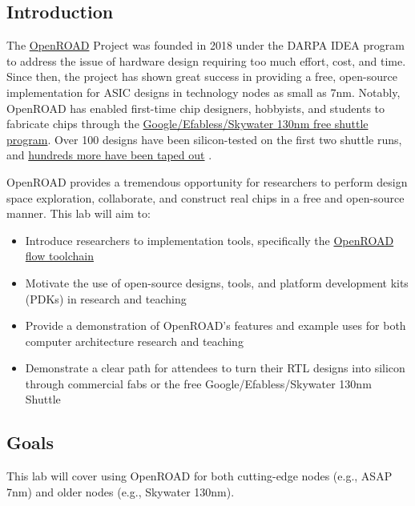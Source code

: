 \documentclass[a4paper,12pt,twoside]{article}
\begin{document}
\subsection{Introduction}
The \href{https://theopenroadproject.org/}{OpenROAD} Project was founded in 2018 under the DARPA IDEA program to address the issue of hardware design requiring too much effort, cost, and time. Since then, the project has shown great success in providing a free, open-source implementation for ASIC designs in technology nodes as small as 7nm. Notably, OpenROAD has enabled first-time chip designers, hobbyists, and students to fabricate chips through the \href{https://efabless.com/open_shuttle_program}{Google/Efabless/Skywater 130nm free shuttle program}. Over 100 designs have been silicon-tested on the first two shuttle runs, and \href{https://opensource.googleblog.com/2022/07/SkyWater-and-Google-expand-open-source-program-to-new-90nm-technology.html}{hundreds more have been taped out} \cite{ajayi2019openroad} \cite{ajayi2019toward}.

OpenROAD provides a tremendous opportunity for researchers to perform design space exploration, collaborate, and construct real chips in a free and open-source manner. This lab will aim to:
\begin{itemize}
    \item Introduce researchers to implementation tools, specifically the \href{https://github.com/The-OpenROAD-Project/OpenROAD-flow-scripts}{OpenROAD flow toolchain}
    \item Motivate the use of open-source designs, tools, and platform development kits (PDKs) in research and teaching
    \item Provide a demonstration of OpenROAD’s features and example uses for both computer architecture research and teaching
    \item Demonstrate a clear path for attendees to turn their RTL designs into silicon through commercial fabs or the free Google/Efabless/Skywater 130nm Shuttle
\end{itemize}
\subsection{Goals}
This lab will cover using OpenROAD for both cutting-edge nodes (e.g., ASAP 7nm) and older nodes (e.g., Skywater 130nm).
\end{document}
